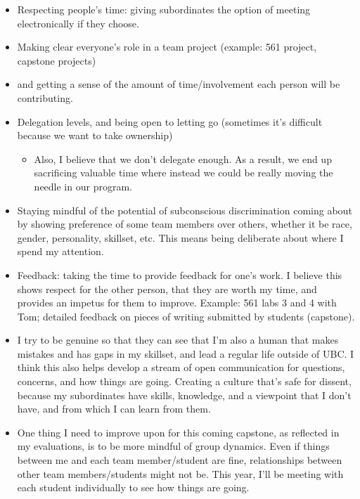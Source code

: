 \documentclass[]{book}
\providecommand{\tightlist}{%
  \setlength{\itemsep}{0pt}\setlength{\parskip}{0pt}}
\begin{document}
\begin{itemize}
\tightlist
\item
  Respecting people's time: giving subordinates the option of meeting electronically if they choose.
\item
  Making clear everyone's role in a team project (example: 561 project, capstone projects)
\item
  and getting a sense of the amount of time/involvement each person will be contributing.
\item
  Delegation levels, and being open to letting go (sometimes it's difficult because we want to take ownership)

  \begin{itemize}
  \tightlist
  \item
    Also, I believe that we don't delegate enough. As a result, we end up sacrificing valuable time where instead we could be really moving the needle in our program.
  \end{itemize}
\item
  Staying mindful of the potential of subconscious discrimination coming about by showing preference of some team members over others, whether it be race, gender, personality, skillset, etc. This means being deliberate about where I spend my attention.
\item
  Feedback: taking the time to provide feedback for one's work. I believe this shows respect for the other person, that they are worth my time, and provides an impetus for them to improve. Example: 561 labs 3 and 4 with Tom; detailed feedback on pieces of writing submitted by students (capstone).
\item
  I try to be genuine so that they can see that I'm also a human that makes mistakes and has gaps in my skillset, and lead a regular life outside of UBC. I think this also helps develop a stream of open communication for questions, concerns, and how things are going. Creating a culture that's safe for dissent, because my subordinates have skills, knowledge, and a viewpoint that I don't have, and from which I can learn from them.
\item
  One thing I need to improve upon for this coming capstone, as reflected in my evaluations, is to be more mindful of group dynamics. Even if things between me and each team member/student are fine, relationships between other team members/students might not be. This year, I'll be meeting with each student individually to see how things are going.
\end{itemize}
\end{document}
